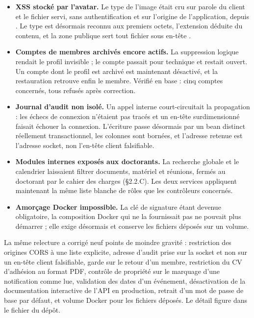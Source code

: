 \begin{itemize}
  \item \textbf{XSS stocké par l'avatar.} Le type de l'image était cru sur parole du client
        et le fichier servi, sans authentification et sur l'origine de l'application, depuis
        . Le type est désormais reconnu aux premiers octets, l'extension
        déduite du contenu, et la zone publique sert tout fichier sous en-tête
        .
  \item \textbf{Comptes de membres archivés encore actifs.} La suppression logique rendait le
        profil invisible ; le compte passait pour technique et restait ouvert. Un compte dont
        le profil est archivé est maintenant désactivé, et la restauration retrouve enfin le
        membre. Vérifié en base : cinq comptes concernés, tous refusés après correction.
  \item \textbf{Journal d'audit non isolé.} Un appel interne court-circuitait la propagation
         : les échecs de connexion n'étaient pas tracés et un en-tête
         surdimensionné faisait échouer la connexion. L'écriture passe
        désormais par un bean distinct réellement transactionnel, les colonnes sont bornées,
        et l'adresse retenue est l'adresse socket, non l'en-tête client falsifiable.
  \item \textbf{Modules internes exposés aux doctorants.} La recherche globale et le
        calendrier laissaient filtrer documents, matériel et réunions, fermés au doctorant
        par le cahier des charges (§2.2.C). Les deux services appliquent maintenant la même liste blanche
        de rôles que les contrôleurs concernés.
  \item \textbf{Amorçage Docker impossible.} La clé de signature étant devenue obligatoire,
        la composition Docker qui ne la fournissait pas ne pouvait plus démarrer ; elle exige
        désormais  et conserve les fichiers déposés sur un volume.
\end{itemize}

La même relecture a corrigé neuf points de moindre gravité : restriction des origines
CORS à une liste explicite, adresse d'audit prise sur la socket et non sur un en-tête
client falsifiable, garde sur le retour d'un membre, restriction du CV d'adhésion au
format PDF, contrôle de propriété sur le marquage d'une notification comme lue, validation
des dates d'un événement, désactivation de la documentation interactive de l'API en
production, retrait d'un mot de passe de base par défaut, et volume Docker pour les fichiers
déposés. Le détail figure dans le fichier  du dépôt.

